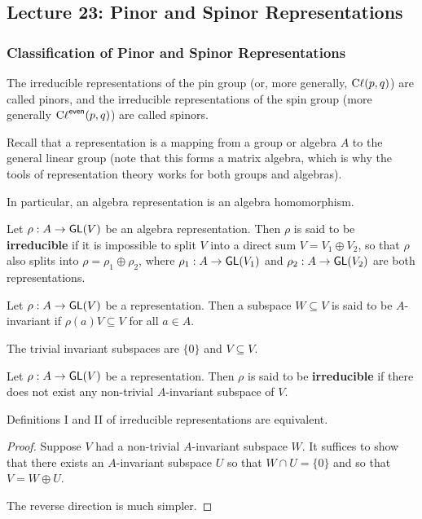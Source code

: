 \subsection{Lecture 23: Pinor and Spinor Representations}
\subsubsection{Classification of Pinor and Spinor Representations}
The irreducible representations of the pin group (or, more generally, $\operatorname{C\ell}(p,q)$) are called pinors, and the irreducible representations of the spin group (more generally $\operatorname{C\ell}^{\textsf{even}}(p,q)$) are called spinors.

Recall that a representation is a mapping from a group or algebra $A$ to the general linear group (note that this forms a matrix algebra, which is why the tools of representation theory works for both groups and algebras).

In particular, an algebra representation is an algebra homomorphism.

\begin{defn}
    Let $\rho : A \to \operatorname{\textsf{GL}}(V)$ be an algebra representation. Then $\rho$ is said to be \textbf{irreducible} if it is impossible to split $V$ into a direct sum $V=V_1\oplus V_2$, so that $\rho$ also splits into $\rho = \rho_1\oplus \rho_2$, where $\rho_1:A\to \operatorname{\textsf{GL}}(V_1)$ and $\rho_2 : A \to \operatorname{\textsf{GL}}(V_2)$ are both representations.
\end{defn}

\begin{defn}
Let $\rho :A \to \operatorname{\textsf{GL}}(V)$ be a representation. Then a subspace $W\subseteq V$ is said to be $A$-invariant if $\rho(a)V \subseteq V$ for all $a\in A$.
\end{defn}
\begin{remark*}
    The trivial invariant subspaces are $\{0\}$ and $V\subseteq V$.
\end{remark*}
\begin{defn} Let $\rho:A\to \operatorname{\textsf{GL}}(V)$ be a representation. Then $\rho$ is said to be \textbf{irreducible} if there does not exist any non-trivial $A$-invariant subspace of $V$.
\end{defn}

\begin{lemma}
    Definitions I and II of irreducible representations are equivalent.
\end{lemma}
\begin{proof}
    Suppose $V$ had a non-trivial $A$-invariant subspace $W$. It suffices to show that there exists an $A$-invariant subspace $U$ so that $W\cap U = \{0\}$ and so that $V=W\oplus U$.

    The reverse direction is much simpler. 
\end{proof}

